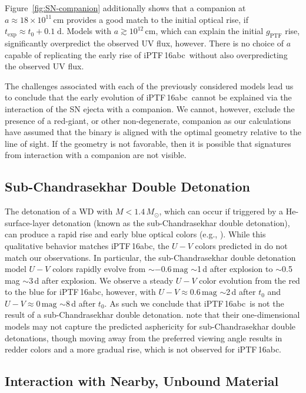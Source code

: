 \documentclass[twocolumn]{aastex61}
\newcommand{\abc}{iPTF\,16abc}
\begin{document}
Figure~\ref{fig:SN-companion} additionally shows that a companion at $a \approx 18 \times 10^{11} \, \mathrm{cm}$ provides a good match to the initial optical rise, if $t_\mathrm{exp} \approx t_0 + 0.1 \; \mathrm{d}$. Models with $a \gtrsim 10^{12} \, \mathrm{cm}$, which can explain the initial $g_\mathrm{PTF}$ rise, significantly overpredict the observed UV flux, however. There is no choice of $a$ capable of replicating the early rise of \abc\ without also overpredicting the observed UV flux.

The challenges associated with each of the previously considered models lead us to conclude that the early evolution of \abc\ cannot be explained via the interaction of the SN ejecta with a companion. We cannot, however, exclude the presence of a red-giant, or other non-degenerate, companion as our calculations have assumed that the binary is aligned with the optimal geometry relative to the line of sight. If the geometry is not favorable, then it is possible that signatures from interaction with a companion are not visible. 

\subsection{Sub-Chandrasekhar Double Detonation}

The detonation of a WD with $M < 1.4 \, M_\odot$, which can occur if triggered by a He-surface-layer detonation (known as the sub-Chandrasekhar double detonation), can produce a rapid rise and early blue optical colors (e.g., \citealt{2017arXiv170603613N}). While this qualitative behavior matches \abc, the $U-V$ colors predicted in \citet{2017arXiv170603613N} do not match our observations. In particular, the sub-Chandrasekhar double detonation model $U - V$ colors rapidly evolve from $\sim$$-0.6\,\mathrm{mag}$ $\sim$1\,d after explosion to $\sim$0.5\,mag $\sim$3\,d after explosion. We observe a steady $U - V$ color evolution from the red to the blue for \abc, however, with $U - V \approx 0.6 \, \mathrm{mag}$ $\sim$2\,d after $t_0$ and $U - V \approx 0 \, \mathrm{mag}$ $\sim$8\,d after $t_0$. As such we conclude that \abc\ is not the result of a sub-Chandrasekhar double detonation. \citet{2017arXiv170603613N} note that their one-dimensional models may not capture the predicted asphericity for sub-Chandrasekhar double detonations, though moving away from the preferred viewing angle results in redder colors and a more gradual rise, which is not observed for \abc. 

\subsection{Interaction with \textbf{Nearby, Unbound} Material}
\end{document}
